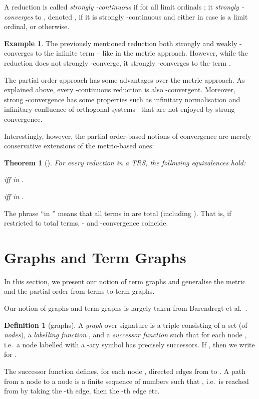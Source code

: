 \documentclass[copyright,creativecommons,UKenglish,final]{eptcs}
\theoremstyle{definition}
\newtheorem{definition}{Definition}[section]
\newtheorem{example}{Example}[section]
\theoremstyle{plain}
\newtheorem{theorem}{Theorem}[section]
\begin{document}
A reduction  is called \emph{strongly
  -continuous} if  for all limit ordinals
; it \emph{strongly -converges} to ,
denoted , if it is strongly -continuous
and either  in case  is a limit ordinal, or 
otherwise.

\begin{example}
  The previously mentioned reduction 
  both strongly and weakly -converges to the infinite term  -- like in the metric
  approach. However, while the reduction  does not
  strongly -converge, it strongly -converges to the term
  .
\end{example}

The partial order approach has some advantages over the metric
approach. As explained above, every -continuous reduction is
also -convergent. Moreover, strong -convergence has some
properties such as infinitary normalisation and infinitary confluence
of orthogonal systems~\cite{bahr10rta2} that are not enjoyed by strong
-convergence.

Interestingly, however, the partial order-based notions of convergence
are merely conservative extensions of the metric-based ones:
\begin{theorem}[\cite{bahr09master,bahr10rta2}] \label{thr:strongExt}
  For every reduction  in a TRS, the following equivalences hold:
  \begin{center}
    \begin{enumerate*}[(i)]
    \item  \quad iff \quad
       in .\label{item:strongExtI}\hspace{8mm}
    \item  \quad iff \quad
       in .\label{item:strongExtII}\end{enumerate*}
  \end{center}
\end{theorem}
The phrase ``in '' means that all terms in  are total
(including ). That is, if restricted to total terms, - and
-convergence coincide.

\section{Graphs and Term Graphs}
\label{sec:graphs-term-graphs}

In this section, we present our notion of term graphs and generalise
the metric  and the partial order  from terms to term
graphs.

Our notion of graphs and term graphs is largely taken from Barendregt et
al.~\cite{barendregt87parle}.
\begin{definition}[graphs]
  \label{def:graph}
A \emph{graph} over signature  is a triple  consisting of a set  (of \emph{nodes}), a
  \emph{labelling function} , and a
  \emph{successor function}  such that
   for each node , i.e.\ a
  node labelled with a -ary symbol has precisely  successors. If
  , then we write 
  for .
\end{definition}
The successor function  defines, for each node , directed
edges from  to .  A path from a node  to a node 
is a finite sequence  of numbers such that
, i.e.\  is reached from 
by taking the -th edge, then the -th edge etc.
\end{document}
